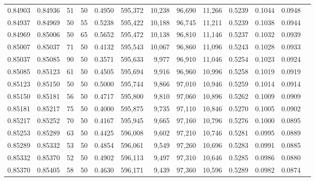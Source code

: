 \begin{tabular}{rrrrrrrrrrrrr}
0.84903 & 0.84936 &    51 &  50 &                                     0.4950 & 595,372 &  10,238 &  96,690 &  11,266 & 0.5239 & 0.1044 & 0.0948 \\
0.84937 & 0.84969 &    50 &  55 &                                     0.5238 & 595,422 &  10,188 &  96,745 &  11,211 & 0.5239 & 0.1038 & 0.0944 \\
0.84969 & 0.85006 &    50 &  65 &                                     0.5652 & 595,472 &  10,138 &  96,810 &  11,146 & 0.5237 & 0.1032 & 0.0939 \\
0.85007 & 0.85037 &    71 &  50 &                                     0.4132 & 595,543 &  10,067 &  96,860 &  11,096 & 0.5243 & 0.1028 & 0.0933 \\
0.85037 & 0.85085 &    90 &  50 &                                     0.3571 & 595,633 &   9,977 &  96,910 &  11,046 & 0.5254 & 0.1023 & 0.0924 \\
0.85085 & 0.85123 &    61 &  50 &                                     0.4505 & 595,694 &   9,916 &  96,960 &  10,996 & 0.5258 & 0.1019 & 0.0919 \\
0.85123 & 0.85150 &    50 &  50 &                                     0.5000 & 595,744 &   9,866 &  97,010 &  10,946 & 0.5259 & 0.1014 & 0.0914 \\
0.85150 & 0.85181 &    56 &  50 &                                     0.4717 & 595,800 &   9,810 &  97,060 &  10,896 & 0.5262 & 0.1009 & 0.0909 \\
0.85181 & 0.85217 &    75 &  50 &                                     0.4000 & 595,875 &   9,735 &  97,110 &  10,846 & 0.5270 & 0.1005 & 0.0902 \\
0.85217 & 0.85252 &    70 &  50 &                                     0.4167 & 595,945 &   9,665 &  97,160 &  10,796 & 0.5276 & 0.1000 & 0.0895 \\
0.85253 & 0.85289 &    63 &  50 &                                     0.4425 & 596,008 &   9,602 &  97,210 &  10,746 & 0.5281 & 0.0995 & 0.0889 \\
0.85289 & 0.85332 &    53 &  50 &                                     0.4854 & 596,061 &   9,549 &  97,260 &  10,696 & 0.5283 & 0.0991 & 0.0885 \\
0.85332 & 0.85370 &    52 &  50 &                                     0.4902 & 596,113 &   9,497 &  97,310 &  10,646 & 0.5285 & 0.0986 & 0.0880 \\
0.85370 & 0.85405 &    58 &  50 &                                     0.4630 & 596,171 &   9,439 &  97,360 &  10,596 & 0.5289 & 0.0982 & 0.0874 \\

\end{tabular}
